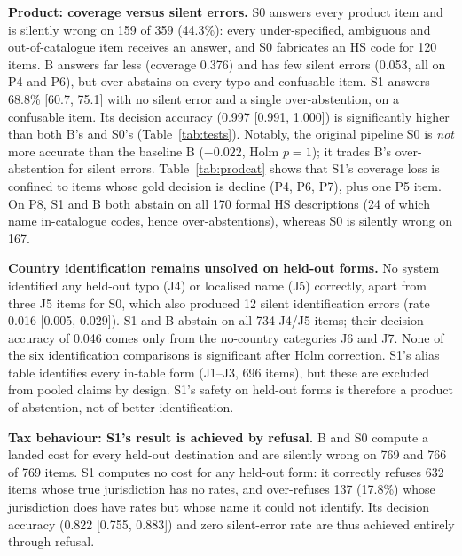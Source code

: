 \documentclass[conference]{IEEEtran}
\begin{document}
\textbf{Product: coverage versus silent errors.} S0 answers every product item and is silently wrong on 159 of 359
(44.3\%): every under-specified, ambiguous and out-of-catalogue item receives an answer, and S0 fabricates an HS code for
120 items. B answers far less (coverage 0.376) and has few silent errors (0.053, all on P4 and P6), but over-abstains on
every typo and confusable item. S1 answers 68.8\% [60.7, 75.1] with no silent error and a single over-abstention, on a
confusable item. Its decision accuracy (0.997 [0.991, 1.000]) is significantly higher than both B's and S0's
(Table~\ref{tab:tests}). Notably, the original pipeline S0 is \emph{not} more accurate than the baseline B
($-0.022$, Holm $p=1$); it trades B's over-abstention for silent errors. Table~\ref{tab:prodcat} shows that S1's coverage
loss is confined to items whose gold decision is decline (P4, P6, P7), plus one P5 item. On P8, S1 and B both abstain
on all 170 formal HS descriptions (24 of which name in-catalogue codes, hence over-abstentions), whereas S0 is silently
wrong on 167.



\textbf{Country identification remains unsolved on held-out forms.} No system identified any held-out typo (J4) or
localised name (J5) correctly, apart from three J5 items for S0, which also produced 12 silent identification errors
(rate 0.016 [0.005, 0.029]). S1 and B abstain on all 734 J4/J5 items; their decision accuracy of 0.046 comes only from the
no-country categories J6 and J7. None of the six identification comparisons is significant after Holm correction. S1's
alias table identifies every in-table form (J1--J3, 696 items), but these are excluded from pooled claims by design. S1's
safety on held-out forms is therefore a product of abstention, not of better identification.

\textbf{Tax behaviour: S1's result is achieved by refusal.} B and S0 compute a landed cost for every held-out destination
and are silently wrong on 769 and 766 of 769 items. S1 computes no cost for any held-out form: it correctly refuses 632
items whose true jurisdiction has no rates, and over-refuses 137 (17.8\%) whose jurisdiction does have rates but whose
name it could not identify. Its decision accuracy (0.822 [0.755, 0.883]) and zero silent-error rate are thus achieved
entirely through refusal.


\end{document}
